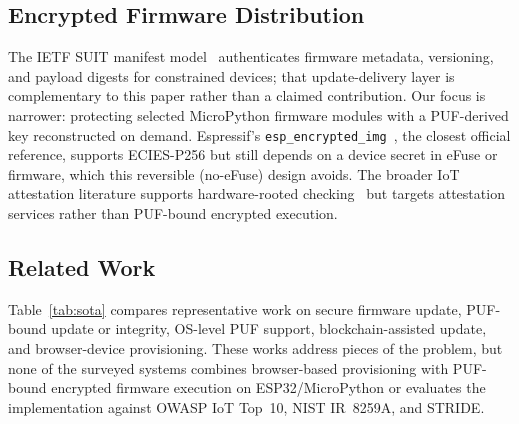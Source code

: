 \documentclass[runningheads]{llncs}
\begin{document}
\subsection{Encrypted Firmware Distribution}

The IETF SUIT manifest model~\cite{rfc9124_suit} authenticates firmware metadata, versioning, and payload digests for constrained devices; that update-delivery layer is complementary to this paper rather than a claimed contribution. Our focus is narrower: protecting selected MicroPython firmware modules with a PUF-derived key reconstructed on demand. Espressif's \texttt{esp\_encrypted\_img}~\cite{espressif_esp_encrypted_img}, the closest official reference, supports ECIES-P256 but still depends on a device secret in eFuse or firmware, which this reversible (no-eFuse) design avoids. The broader IoT attestation literature supports hardware-rooted checking~\cite{kuang2022survey} but targets attestation services rather than PUF-bound encrypted execution.

\subsection{Related Work}
\label{sec:sota}

Table~\ref{tab:sota} compares representative work on secure firmware update, PUF-bound update or integrity, OS-level PUF support, blockchain-assisted update, and browser-device provisioning. These works address pieces of the problem, but none of the surveyed systems combines browser-based provisioning with PUF-bound encrypted firmware execution on ESP32/MicroPython or evaluates the implementation against OWASP IoT Top~10, NIST IR~8259A, and STRIDE.
\end{document}
